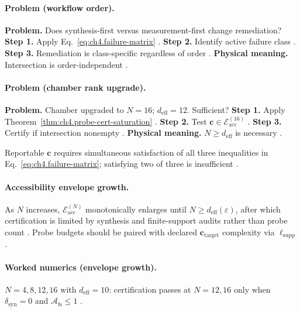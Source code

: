 \paragraph{Problem (workflow order).}
\textbf{Problem.} Does synthesis-first versus measurement-first change remediation?
\textbf{Step 1.} Apply Eq.~\eqref{eq:ch4.failure-matrix} \cite{harrington2001,stratton1941}.
\textbf{Step 2.} Identify active failure class \cite{hansen1988,devaney2004}.
\textbf{Step 3.} Remediation is class-specific regardless of order \cite{jackson1999,collin2001}.
\textbf{Physical meaning.} Intersection is order-independent \cite{harrington2001,stratton1941}.

\paragraph{Problem (chamber rank upgrade).}
\textbf{Problem.} Chamber upgraded to \(N=16\); \(d_{\mathrm{eff}}=12\). Sufficient?
\textbf{Step 1.} Apply Theorem~\ref{thm:ch4.probe-cert-saturation} \cite{harrington2001,hansen1988}.
\textbf{Step 2.} Test \(\mathbf{c}\in\mathcal{E}_{\mathrm{acc}}^{(16)}\) \cite{devaney2004,stratton1941}.
\textbf{Step 3.} Certify if intersection nonempty \cite{jackson1999,collin2001}.
\textbf{Physical meaning.} \(N\ge d_{\mathrm{eff}}\) is necessary \cite{harrington2001}.

\begin{corollary}
\label{cor:ch4.intersection-mandatory}
Reportable \(\mathbf{c}\) requires simultaneous satisfaction of all three inequalities in Eq.~\eqref{eq:ch4.failure-matrix}; satisfying two of three is
insufficient \cite{stratton1941,harrington2001,hansen1988,devaney2004,jackson1999}.
\end{corollary}

\paragraph{Accessibility envelope growth.}
As \(N\) increases, \(\mathcal{E}_{\mathrm{acc}}^{(N)}\) monotonically enlarges until \(N\ge d_{\mathrm{eff}}(\varepsilon)\), after which certification is
limited by synthesis and finite-support audits rather than probe count \cite{harrington2001,devaney2004,hansen1988,stratton1941,jackson1999,collin2001}.
Probe budgets should be paired with declared \(\mathbf{c}_{\mathrm{target}}\) complexity via \(\ell_{\mathrm{supp}}\) \cite{harrington2001,stratton1941}.

\paragraph{Worked numerics (envelope growth).}
\(N=4,8,12,16\) with \(d_{\mathrm{eff}}=10\): certification passes at \(N=12,16\) only when \(\delta_{\mathrm{syn}}=0\) and \(\mathcal{A}_{\mathrm{fs}}\le1\)
\cite{harrington2001,hansen1988,stratton1941,devaney2004,jackson1999,collin2001}.

